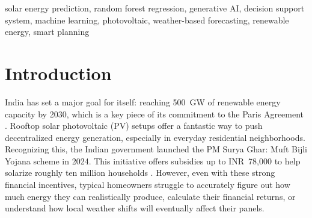 \documentclass[conference]{IEEEtran}
\begin{document}
\begin{abstract}
As rooftop solar photovoltaic (PV) installations become increasingly popular across India, there is a growing need for reliable energy forecasting tools to help homeowners make confident, informed financial decisions. In this paper, we introduce SolarPredict: a full-stack, web-based decision support system. It combines machine learning-based solar energy predictions with real-time weather data, detailed financial modeling, and an advisory layer powered by Generative AI. At its core, the prediction engine relies on a Random Forest Regressor. We trained it using 136,476 operational records from two active solar power plants, and it achieved an impressive 0.853 coefficient of determination (R\textsuperscript{2}) alongside a 0.032 normalized mean absolute error (MAE) on unseen test data. Alongside the predictive features, we integrated Google Gemini to act as an intelligent planning assistant. It translates raw technical outputs into personalized, easy-to-read advice on everything from financial returns to optimal times for running household appliances. The underlying architecture relies on a three-tier microservice model---specifically a React frontend, an Express.js API gateway, and a FastAPI machine learning inference service connected to a MongoDB database. Moreover, SolarPredict pulls live weather conditions via the OpenWeather API and directly incorporates up-to-date Indian government subsidies, like those under the PM Surya Ghar scheme. Ultimately, our system goes beyond simply estimating solar outputs; it actively guides homeowners through the financial and practical realities of adopting solar energy.
\end{abstract}

\begin{IEEEkeywords}
solar energy prediction, random forest regression, generative AI, decision support system, machine learning, photovoltaic, weather-based forecasting, renewable energy, smart planning
\end{IEEEkeywords}

\section{Introduction}

India has set a major goal for itself: reaching 500~GW of renewable energy capacity by 2030, which is a key piece of its commitment to the Paris Agreement \cite{b1}. Rooftop solar photovoltaic (PV) setups offer a fantastic way to push decentralized energy generation, especially in everyday residential neighborhoods. Recognizing this, the Indian government launched the PM Surya Ghar: Muft Bijli Yojana scheme in 2024. This initiative offers subsidies up to INR~78,000 to help solarize roughly ten million households \cite{b2}. However, even with these strong financial incentives, typical homeowners struggle to accurately figure out how much energy they can realistically produce, calculate their financial returns, or understand how local weather shifts will eventually affect their panels.
\end{document}
